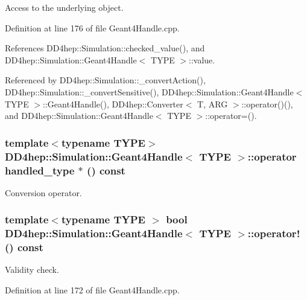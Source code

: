 Access to the underlying object. 

Definition at line 176 of file Geant4Handle.cpp.

References DD4hep::Simulation::checked\_\-value(), and DD4hep::Simulation::Geant4Handle$<$ TYPE $>$::value.

Referenced by DD4hep::Simulation::\_\-convertAction(), DD4hep::Simulation::\_\-convertSensitive(), DD4hep::Simulation::Geant4Handle$<$ TYPE $>$::Geant4Handle(), DD4hep::Converter$<$ T, ARG $>$::operator()(), and DD4hep::Simulation::Geant4Handle$<$ TYPE $>$::operator=().\hypertarget{class_d_d4hep_1_1_simulation_1_1_geant4_handle_a1544c6b402adaf90da56991dfdaf87b6}{
\subsubsection[{operator handled\_\-type $\ast$}]{\setlength{\rightskip}{0pt plus 5cm}template$<$typename TYPE$>$ {\bf DD4hep::Simulation::Geant4Handle}$<$ TYPE $>$::operator {\bf handled\_\-type} $\ast$ () const}}
\label{class_d_d4hep_1_1_simulation_1_1_geant4_handle_a1544c6b402adaf90da56991dfdaf87b6}


Conversion operator. \hypertarget{class_d_d4hep_1_1_simulation_1_1_geant4_handle_ab8fc941ffeb55715ef6aa2b84b363dbb}{
\subsubsection[{operator!}]{\setlength{\rightskip}{0pt plus 5cm}template$<$typename TYPE $>$ bool {\bf DD4hep::Simulation::Geant4Handle}$<$ TYPE $>$::operator! () const}}
\label{class_d_d4hep_1_1_simulation_1_1_geant4_handle_ab8fc941ffeb55715ef6aa2b84b363dbb}


Validity check. 

Definition at line 172 of file Geant4Handle.cpp.

